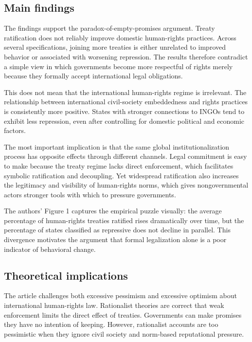 \subsection{Main findings}

The findings support the paradox-of-empty-promises argument. Treaty ratification does not reliably improve domestic human-rights practices. Across several specifications, joining more treaties is either unrelated to improved behavior or associated with worsening repression. The results therefore contradict a simple view in which governments become more respectful of rights merely because they formally accept international legal obligations.

This does not mean that the international human-rights regime is irrelevant. The relationship between international civil-society embeddedness and rights practices is consistently more positive. States with stronger connections to INGOs tend to exhibit less repression, even after controlling for domestic political and economic factors.

The most important implication is that the same global institutionalization process has opposite effects through different channels. Legal commitment is easy to make because the treaty regime lacks direct enforcement, which facilitates symbolic ratification and decoupling. Yet widespread ratification also increases the legitimacy and visibility of human-rights norms, which gives nongovernmental actors stronger tools with which to pressure governments.

The authors' Figure 1 captures the empirical puzzle visually: the average percentage of human-rights treaties ratified rises dramatically over time, but the percentage of states classified as repressive does not decline in parallel. This divergence motivates the argument that formal legalization alone is a poor indicator of behavioral change.

\subsection{Theoretical implications}

The article challenges both excessive pessimism and excessive optimism about international human-rights law. Rationalist theories are correct that weak enforcement limits the direct effect of treaties. Governments can make promises they have no intention of keeping. However, rationalist accounts are too pessimistic when they ignore civil society and norm-based reputational pressure.

